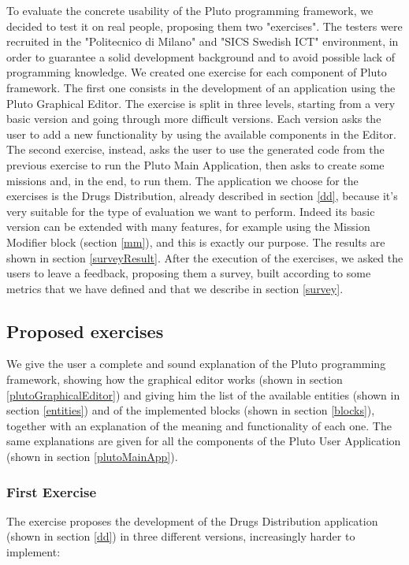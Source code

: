 To evaluate the concrete usability of the Pluto programming framework, we decided to test it on real people, proposing them two "exercises".
The testers were recruited in the "Politecnico di Milano" and "SICS Swedish ICT" environment, in order to guarantee a solid development background and to avoid possible lack of programming knowledge.
We created one exercise for each component of Pluto framework.
The first one consists in the development of an application using the Pluto Graphical Editor.
The exercise is split in three levels, starting from a very basic version and going through more difficult versions. Each version asks the user to add a new functionality by using the available components in the Editor.
The second exercise, instead, asks the user to use the generated code from the previous exercise to run the Pluto Main Application, then asks to create some missions and, in the end, to run them.
The application we choose for the exercises is the Drugs Distribution, already described in section \ref{dd}, because it's very suitable for the type of evaluation we want to perform.
Indeed its basic version can be extended with many features, for example using the Mission Modifier block (section \ref{mm}), and this is exactly our purpose.
The results are shown in section \ref{surveyResult}.
After the execution of the exercises, we asked the users to leave a feedback, proposing them a survey, built according to some metrics that we have defined and that we describe in section \ref{survey}.

\subsection{Proposed exercises}
\label{exercise}

We give the user a complete and sound explanation of the Pluto programming framework, showing how the graphical editor works (shown in section \ref{plutoGraphicalEditor}) and giving him the list of the available entities (shown in section \ref{entities}) and of the implemented blocks (shown in section \ref{blocks}), together with an explanation of the meaning and functionality of each one.
The same explanations are given for all the components of the Pluto User Application (shown in section \ref{plutoMainApp}).

\subsubsection{First Exercise}

The exercise proposes the development of the Drugs Distribution application (shown in section \ref{dd}) in three different versions, increasingly harder to implement:

